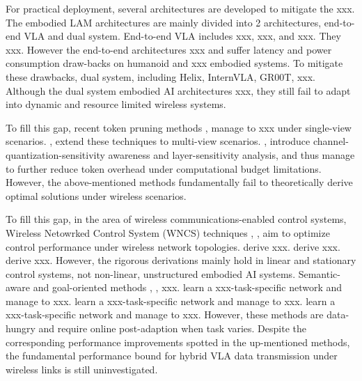 \documentclass[lettersize,journal]{IEEEtran}
\theoremstyle{custom}
\begin{document}
For practical deployment, several architectures are developed to mitigate the xxx. The embodied LAM architectures are mainly divided into 2 architectures, end-to-end VLA and dual system. End-to-end VLA includes xxx, xxx, and xxx. They xxx. However the end-to-end architectures xxx and suffer latency and power consumption draw-backs on humanoid and xxx embodied systems. To mitigate these drawbacks, dual system, including Helix, InternVLA, GR00T, xxx. Although the dual system embodied AI architectures xxx, they still fail to adapt into dynamic and resource limited wireless systems. 

To fill this gap, recent token pruning methods \cite{}, \cite{} manage to xxx under single-view scenarios. \cite{}, \cite{} extend these techniques to multi-view scenarios. \cite{}, \cite{} introduce channel-quantization-sensitivity awareness and layer-sensitivity analysis, and thus manage to further reduce token overhead under computational budget limitations.  However, the above-mentioned methods fundamentally fail to theoretically derive optimal solutions under wireless scenarios. 

To fill this gap, in the area of wireless communications-enabled control systems, Wireless Netowrked Control System (WNCS) techniques \cite{}, \cite{}, \cite{} aim to optimize control performance under wireless network topologies. \cite{} derive xxx. \cite{} derive xxx. \cite{} derive xxx. However, the rigorous derivations mainly hold in linear and stationary control systems, not non-linear, unstructured embodied AI systems. Semantic-aware and goal-oriented methods \cite{}, \cite{}, \cite{} xxx. \cite{} learn a xxx-task-specific network and manage to xxx. \cite{} learn a xxx-task-specific network and manage to xxx. \cite{} learn a xxx-task-specific network and manage to xxx. However, these methods are data-hungry and require online post-adaption when task varies. Despite the corresponding performance improvements spotted in the up-mentioned methods, the fundamental performance bound for hybrid VLA data transmission under wireless links is still uninvestigated. 
\end{document}
